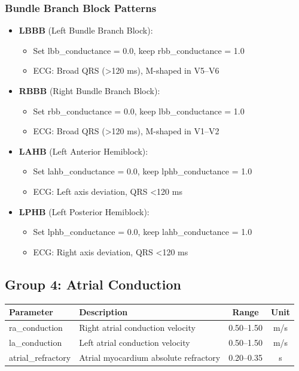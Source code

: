 \documentclass[11pt, a4paper]{article}
\begin{document}
\subsubsection{Bundle Branch Block Patterns}
\begin{itemize}
    \item \textbf{LBBB} (Left Bundle Branch Block):
    \begin{itemize}
        \item Set lbb\_conductance = 0.0, keep rbb\_conductance = 1.0
        \item ECG: Broad QRS (>120 ms), M-shaped in V5--V6
    \end{itemize}
    \item \textbf{RBBB} (Right Bundle Branch Block):
    \begin{itemize}
        \item Set rbb\_conductance = 0.0, keep lbb\_conductance = 1.0
        \item ECG: Broad QRS (>120 ms), M-shaped in V1--V2
    \end{itemize}
    \item \textbf{LAHB} (Left Anterior Hemiblock):
    \begin{itemize}
        \item Set lahb\_conductance = 0.0, keep lphb\_conductance = 1.0
        \item ECG: Left axis deviation, QRS <120 ms
    \end{itemize}
    \item \textbf{LPHB} (Left Posterior Hemiblock):
    \begin{itemize}
        \item Set lphb\_conductance = 0.0, keep lahb\_conductance = 1.0
        \item ECG: Right axis deviation, QRS <120 ms
    \end{itemize}
\end{itemize}

\subsection{Group 4: Atrial Conduction}

\begin{tabularx}{\textwidth}{|l|X|c|c|}
\hline
\textbf{Parameter} & \textbf{Description} & \textbf{Range} & \textbf{Unit} \\
\hline
ra\_conduction & Right atrial conduction velocity & 0.50--1.50 & m/s \\
la\_conduction & Left atrial conduction velocity & 0.50--1.50 & m/s \\
atrial\_refractory & Atrial myocardium absolute refractory & 0.20--0.35 & s \\
\hline
\end{tabularx}
\end{document}
